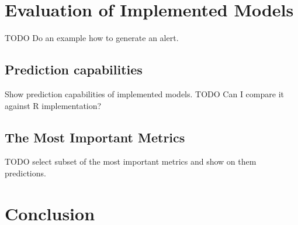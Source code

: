 \chapter{Evaluation of Implemented Models}
TODO Do an example how to generate an alert.

    \section{Prediction capabilities}
    Show prediction capabilities of implemented models.
    TODO Can I compare it against R implementation?

    \section{The Most Important Metrics}
    TODO select subset of the most important metrics and show on them predictions.

\chapter{Conclusion}

